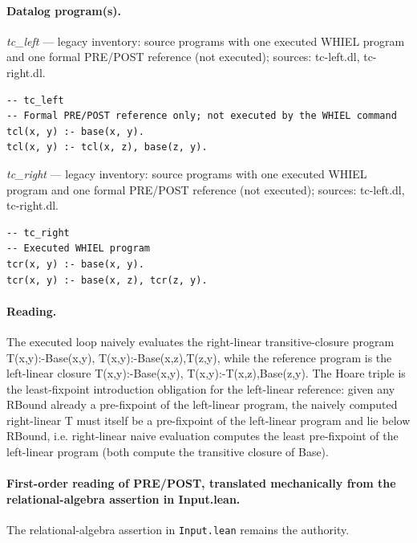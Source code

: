 \documentclass[10pt]{article}
\begin{document}
\paragraph{Datalog program(s).}

{\raggedright\textit{tc\_left} --- legacy inventory: source programs with one executed WHIEL program and one formal PRE/POST reference (not executed); sources: tc-left.dl, tc-right.dl.\par}

\begin{Verbatim}[fontsize=\scriptsize,breaklines=true,breakanywhere=true,frame=single,framesep=1.5mm]
-- tc_left
-- Formal PRE/POST reference only; not executed by the WHIEL command
tcl(x, y) :- base(x, y).
tcl(x, y) :- tcl(x, z), base(z, y).
\end{Verbatim}

{\raggedright\textit{tc\_right} --- legacy inventory: source programs with one executed WHIEL program and one formal PRE/POST reference (not executed); sources: tc-left.dl, tc-right.dl.\par}

\begin{Verbatim}[fontsize=\scriptsize,breaklines=true,breakanywhere=true,frame=single,framesep=1.5mm]
-- tc_right
-- Executed WHIEL program
tcr(x, y) :- base(x, y).
tcr(x, y) :- base(x, z), tcr(z, y).
\end{Verbatim}

\paragraph{Reading.} The executed loop naively evaluates the right-linear transitive-closure program T(x,y):-Base(x,y), T(x,y):-Base(x,z),T(z,y), while the reference program is the left-linear closure T(x,y):-Base(x,y), T(x,y):-T(x,z),Base(z,y). The Hoare triple is the least-fixpoint introduction obligation for the left-linear reference: given any RBound already a pre-fixpoint of the left-linear program, the naively computed right-linear T must itself be a pre-fixpoint of the left-linear program and lie below RBound, i.e. right-linear naive evaluation computes the least pre-fixpoint of the left-linear program (both compute the transitive closure of Base).

\paragraph{First-order reading of PRE/POST, translated mechanically from the relational-algebra assertion in Input.lean.} The relational-algebra assertion in \texttt{Input.lean} remains the authority.
\end{document}
